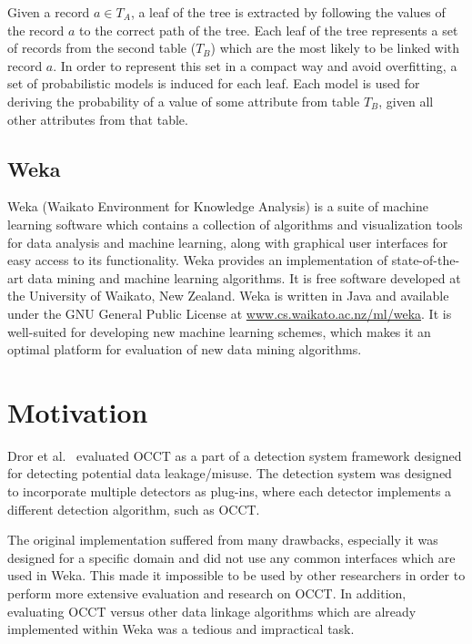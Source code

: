 \documentclass[a4paper,12pt]{article}
\begin{document}
\begin{spacing}{1.5}
Given a record $a \in T_{A}$, a leaf of the tree is extracted by following the values of the record $a$ to the correct path of the tree. Each leaf of the tree represents a set of records from the second table ($T_{B}$) which are the most likely to be linked with record $a$. In order to represent this set in a compact way and avoid overfitting, a set of probabilistic models is induced for each leaf. Each model is used for deriving the probability of a value of some attribute from table $T_{B}$, given all other attributes from that table.


\subsection{Weka}
Weka (Waikato Environment for Knowledge Analysis) is a suite of machine learning software which contains a collection of algorithms and visualization tools for data analysis and machine learning, along with graphical user interfaces for easy access to its functionality. Weka provides an implementation of state-of-the-art data mining and machine learning algorithms. It is free software developed at the University of Waikato, New Zealand. Weka is written in Java and available under the GNU General Public License at \url{www.cs.waikato.ac.nz/ml/weka}. It is well-suited for developing new machine learning schemes, which makes it an optimal platform for evaluation of new data mining algorithms.

\vspace{-0.2cm}
\section{Motivation}
Dror et al.~\cite{dror2011thesis,dror2014occt} evaluated OCCT as a part of a detection system framework designed for detecting potential data leakage/misuse. The detection system was designed to incorporate multiple detectors as plug-ins, where each detector implements a different detection algorithm, such as OCCT.

The original implementation suffered from many drawbacks, especially it was designed for a specific domain and did not use any common interfaces which are used in Weka. This made it impossible to be used by other researchers in order to perform more extensive evaluation and research on OCCT. In addition, evaluating OCCT versus other data linkage algorithms which are already implemented within Weka was a tedious and impractical task.


\end{spacing}
\end{document}
